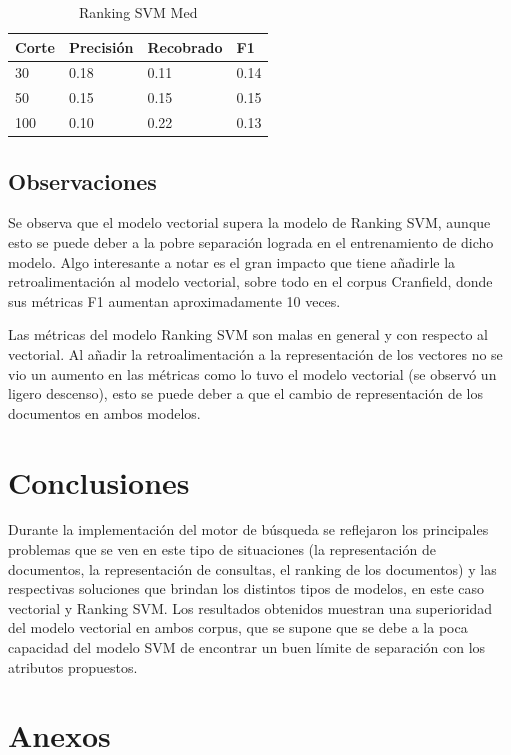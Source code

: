 \documentclass[runningheads]{llncs}
\begin{document}
\begin{table}
	\caption{Ranking SVM Med}\label{med_svm_result}
 \begin{tabular}{|l|l|l|l|}
 \hline
 	Corte &  Precisión & Recobrado & F1\\
 \hline
	30 & 0.18 & 0.11 & 0.14\\
	50 & 0.15 & 0.15 & 0.15\\
	100 & 0.10 & 0.22 & 0.13\\
 \hline
 \end{tabular}
\end{table}

\subsection{Observaciones}

Se observa que el modelo vectorial supera la modelo de Ranking SVM, aunque esto se puede deber a 
la pobre separación lograda en el entrenamiento de dicho modelo. Algo interesante a notar es el gran 
impacto que tiene añadirle la retroalimentación al modelo vectorial, sobre todo en el corpus Cranfield, 
donde sus métricas F1 aumentan aproximadamente 10 veces.

Las métricas del modelo Ranking SVM son malas en general y con respecto al vectorial. Al añadir la retroalimentación
a la representación de los vectores no se vio un aumento en las métricas como lo tuvo el modelo vectorial (se observó un
ligero descenso), esto se puede deber a que el cambio de representación de los documentos en ambos modelos.

\section{Conclusiones}

Durante la implementación del motor de búsqueda se reflejaron los principales problemas que se
ven en este tipo de situaciones (la representación de documentos, la representación de consultas, 
el ranking de los documentos) y las respectivas soluciones que brindan los distintos tipos de modelos,
en este caso vectorial y Ranking SVM. Los resultados obtenidos muestran una superioridad del modelo
vectorial en ambos corpus, que se supone que se debe a la poca capacidad del modelo SVM de encontrar
un buen límite de separación con los atributos propuestos. 

\newpage

\section{Anexos}
\end{document}
